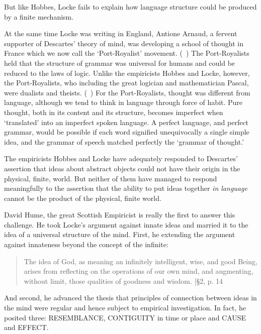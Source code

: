 \begin{refsection}
But like Hobbes, Locke fails to explain how language structure could be produced by a finite mechanism.

At the same time Locke was writing in England, Antione Arnaud, a fervent supporter of Descartes' theory of mind, was developing a school of thought in France which we now call the `Port-Royalist' movement. (~\citep{Carr:1996uw}) The Port-Royalists held that the structure of grammar was universal for humans and could be reduced to the laws of logic. Unlike the empiricists Hobbes and Locke, however, the Port-Royalists, who including the great logician and mathematician Pascal, were dualists and theists. (~\citep{Clark1903}) For the Port-Royalists, thought was different from language, although we tend to think in language through force of habit. Pure thought, both in its content and its structure, becomes imperfect when `translated' into an imperfect spoken language. A perfect language, and perfect grammar, would be possible if each word signified unequivocally a single simple idea, and the grammar of speech matched perfectly the `grammar of thought.' 

The empiricists Hobbes and Locke have adequately responded to Descartes' assertion that ideas about abstract objects could not have their origin in the physical, finite, world. But neither of them have managed to respond meaningfully to the assertion that the ability to put ideas together \emph{in language} cannot be the product of the physical, finite world.

David Hume, the great Scottish Empiricist is really the first to answer this challenge. He took Locke's argument against innate ideas and married it to the idea of a universal structure of the mind. First, he extending the argument against innateness beyond the concept of the infinite:

\begin{quote}

The idea of God, as meaning an infinitely intelligent, wise, and good Being, arises from reflecting on the operations of our own mind, and augmenting, without limit, those qualities of goodness and wisdom. [\S 2, p. 14~\citep{Hume:IGMvPNU2}
\end{quote}

And second, he advanced the thesis that principles of connection between ideas in the mind were regular and hence subject to empirical investigation. In fact, he posited three: RESEMBLANCE, CONTIGUITY in time or place and CAUSE and EFFECT. ~\citep[Part 1, \S  IV]{Hume:2000ws}


\end{refsection}
